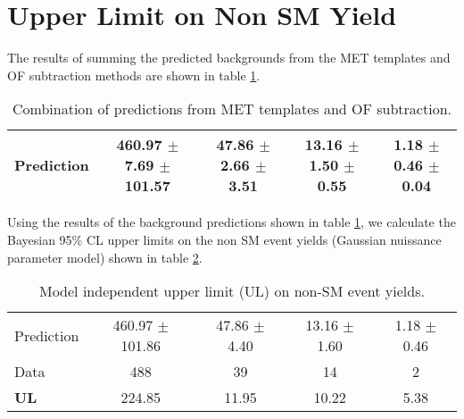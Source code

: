 \section{Upper Limit on Non SM Yield}
\label{sec:upperlimit}

The results of summing the predicted backgrounds from the MET templates and OF subtraction
methods are shown in table \ref{tab:systrestot}.


\begin{table}[hbt]
  \begin{center}
	\caption{
	  \label{tab:systrestot}
	  Combination of predictions from MET templates and OF subtraction.
	}
	\begin{tabular}{lcccc}
	  \hline
	  \resulttitle
\hline

Prediction & 460.97 $\pm$ 7.69 $\pm$ 101.57  &    47.86 $\pm$ 2.66 $\pm$ 3.51  &    13.16 $\pm$ 1.50 $\pm$ 0.55  &     1.18 $\pm$ 0.46 $\pm$ 0.04  \\

\hline
	\end{tabular}
  \end{center}
\end{table}



Using the results of the background predictions shown in table \ref{tab:systrestot},
we calculate the Bayesian 95\% CL
upper limits on the non SM event yields (Gaussian nuissance parameter model) shown in 
table \ref{tab:modinul}.

\begin{table}[hbt]
  \begin{center}
	\caption{
	  \label{tab:modinul}
	  Model independent upper limit (UL) on non-SM event yields.
	}
	\begin{tabular}{lcccc}
	  \hline
	  \resulttitle
\hline

Prediction & 460.97 $\pm$ 101.86  &    47.86 $\pm$ 4.40  &    13.16 $\pm$ 1.60  &     1.18 $\pm$ 0.46 \\

Data      &                488  &                   39  &                   14  &                    2  \\
\hline
{\bf UL}        &224.85  &  11.95  &  10.22  &  5.38\\


\hline
	\end{tabular}
  \end{center}
\end{table}

